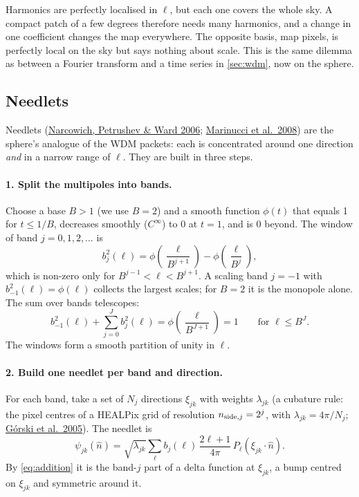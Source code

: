 \documentclass[11pt,a4paper]{article}
\begin{document}
Harmonics are perfectly localised in $\ell$, but each one covers the whole sky. A
compact patch of a few degrees therefore needs many harmonics, and a change in one
coefficient changes the map everywhere. The opposite basis, map pixels, is perfectly
local on the sky but says nothing about scale. This is the same dilemma as between a
Fourier transform and a time series in \cref{sec:wdm}, now on the sphere.

\subsection{Needlets}

Needlets (\href{https://doi.org/10.1137/040614359}{Narcowich, Petrushev \& Ward 2006};
\href{https://arxiv.org/abs/0707.0844}{Marinucci et al.\ 2008}) are the sphere's
analogue of the WDM packets: each is concentrated around one direction \emph{and} in
a narrow range of $\ell$. They are built in three steps.

\paragraph{1. Split the multipoles into bands.} Choose a base $B>1$ (we use $B=2$) and
a smooth function $\phi(t)$ that equals 1 for $t\le1/B$, decreases smoothly ($C^\infty$)
to 0 at $t=1$, and is 0 beyond. The window of band $j=0,1,2,\dots$ is
\begin{equation}
  b_j^2(\ell) = \phi\!\left(\frac{\ell}{B^{j+1}}\right) - \phi\!\left(\frac{\ell}{B^{j}}\right),
\end{equation}
which is non-zero only for $B^{j-1}<\ell<B^{j+1}$. A scaling band $j=-1$ with
$b^2_{-1}(\ell)=\phi(\ell)$ collects the largest scales; for $B=2$ it is the monopole
alone. The sum over bands telescopes:
\begin{equation}
  b^2_{-1}(\ell) + \sum_{j=0}^{J}b_j^2(\ell) = \phi\!\left(\frac{\ell}{B^{J+1}}\right) = 1
  \qquad\text{for } \ell\le B^{J}.
  \label{eq:partition}
\end{equation}
The windows form a smooth partition of unity in $\ell$.

\paragraph{2. Build one needlet per band and direction.} For each band, take a set of
$N_j$ directions $\xi_{jk}$ with weights $\lambda_{jk}$ (a cubature rule: the pixel
centres of a HEALPix grid of resolution $n_{{\rm side},j}=2^j$, with
$\lambda_{jk}=4\pi/N_j$; \href{https://arxiv.org/abs/astro-ph/0409513}{G\'orski et al.\ 2005}). The needlet is
\begin{equation}
  \boxed{\;\psi_{jk}(\hat n) = \sqrt{\lambda_{jk}}\sum_{\ell}b_j(\ell)\,
  \frac{2\ell+1}{4\pi}\,P_\ell(\xi_{jk}\cdot\hat n).\;}
  \label{eq:needlet}
\end{equation}
By \cref{eq:addition} it is the band-$j$ part of a delta function at $\xi_{jk}$, a bump
centred on $\xi_{jk}$ and symmetric around it.
\end{document}
